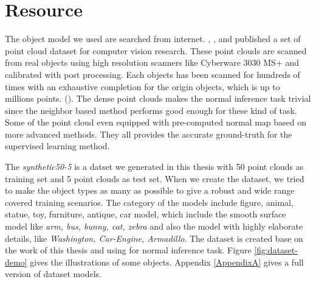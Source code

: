 \section{Resource}
The object model we used are searched from internet.
\cite{data1}, \cite{data2}, \cite{data3} and \cite{data4} published a set of point cloud dataset for computer vision research. These point clouds are scanned from real objects using high resolution scanners like Cyberware 3030 MS+ and calibrated with post processing. Each objects has been scanned for hundreds of times with an exhaustive completion for the origin objects, which is up to millions points. (\cite{data1}). The dense point clouds makes the normal inference task trivial since the neighbor based method performs good enough for these kind of task. Some of the point cloud even equipped with pre-computed normal map based on more advanced methods. They all provides the accurate ground-truth for the supervised learning method.

The \textit{synthetic50-5} is a datset we generated in this thesis with 50 point clouds as training set and 5 point clouds as test set. When we create the dataset, we tried to make the object types as many as possible to give a robust and wide range covered training scenarios. The category of the models include figure, animal, statue, toy, furniture, antique, car model, which include the smooth surface model like \textit{arm, bus, bunny, cat, zebra} and also the model with highly elaborate details, like \textit{Washington, Car-Engine, Armadillo}. 
The dataset is created base on the work of this thesis and using for normal inference task. Figure \ref{fig:dataset-demo} gives the illustrations of some objects. Appendix \ref{AppendixA} gives a full version of dataset models.

